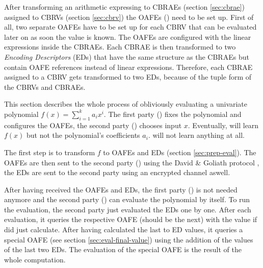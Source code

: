 %
%
\label{sec:prep-eval}

After transforming an arithmetic expressing to CBRAEs (section \ref{sec:cbrae})
assigned to CBRVs (section \ref{sec:cbrv}) the OAFEs (\cite{davidgoliath}) need
to be set up. First of all, two separate OAFEs have to be set up for each CBRV
that can be evaluated later on as soon the value is known. The OAFEs are
configured with the linear expressions inside the CBRAEs. Each CBRAE is then
transformed to two \emph{Encoding Descriptors} (EDs) that have the same
structure as the CBRAEs but contain OAFE references instead of linear
expressions. Therefore, each CBRAE assigned to a CBRV gets transformed to two
EDs, because of the tuple form of the CBRVs and CBRAEs.


%
%
\label{sec:ope}

This section describes the whole process of obliviously evaluating a univariate
polynomial $f(x) = \sum_{i=1}^k a_ix^i$. The first party (\JWpOne{}) fixes the
polynomial and configures the OAFEs, the second party (\JWpTwo{}) chooses input
$x$. Eventually, \JWpTwo{} will learn $f(x)$ but not the polynomial's
coefficients $a_i$. \JWpOne{} will not learn anything at all.

The first step is to transform $f$ to OAFEs and EDs (section
\ref{sec:prep-eval}). The OAFEs are then sent to the second party (\JWpTwo{})
using the David \& Goliath protocol \cite{davidgoliath}, the EDs are sent to the
second party using an encrypted channel aswell.

After having received the OAFEs and EDs, the first party (\JWpOne{}) is not
needed anymore and the second party (\JWpTwo{}) can evaluate the polynomial by
itself. To run the evaluation, the second party just evaluated the EDs one by
one. After each evaluation, it queries the respective OAFE (should be the next)
with the value if did just calculate. After having calculated the last to ED
values, it queries a special OAFE (see section \ref{sec:eval-final-value}) using
the addition of the values of the last two EDs. The evaluation of the special
OAFE is the result of the whole computation.
